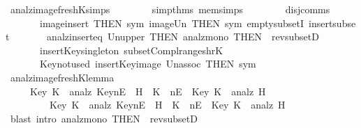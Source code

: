 \begin{isabellebody}
  \isamarkupfalse%
  \endisatagproof
  {\isafoldproof}%
  \isadelimproof
  \isanewline
  \endisadelimproof
  \isanewline
  \isamarkupfalse%
  \ analz{\isacharunderscore}image{\isacharunderscore}freshK{\isacharunderscore}simps\ {\isacharequal}\isanewline
  \ \ \ \ \ \ \ simp{\isacharunderscore}thms\ mem{\isacharunderscore}simps\ %
  \isanewline
  \ \ \ \ \ \ \ disj{\isacharunderscore}comms\ \isanewline
  \ \ \ \ \ \ \ image{\isacharunderscore}insert\ {\isacharbrackleft}THEN\ sym{\isacharbrackright}\ image{\isacharunderscore}Un\ {\isacharbrackleft}THEN\ sym{\isacharbrackright}\ empty{\isacharunderscore}subsetI\ insert{\isacharunderscore}subset\isanewline
  \ \ \ \ \ \ \ analz{\isacharunderscore}insert{\isacharunderscore}eq\ Un{\isacharunderscore}upper{}\ {\isacharbrackleft}THEN\ analz{\isacharunderscore}mono{\isacharcomma}\ THEN\ {\isacharbrackleft}{}{\isacharbrackright}\ rev{\isacharunderscore}subsetD{\isacharbrackright}\isanewline
  \ \ \ \ \ \ \ insert{\isacharunderscore}Key{\isacharunderscore}singleton\ subset{\isacharunderscore}Compl{\isacharunderscore}range{\isacharunderscore}shrK\isanewline
  \ \ \ \ \ \ \ Key{\isacharunderscore}not{\isacharunderscore}used\ insert{\isacharunderscore}Key{\isacharunderscore}image\ Un{\isacharunderscore}assoc\ {\isacharbrackleft}THEN\ sym{\isacharbrackright}\isanewline
  \isanewline
  \isanewline
  \isamarkupfalse%
  \ analz{\isacharunderscore}image{\isacharunderscore}freshK{\isacharunderscore}lemma{\isacharcolon}\isanewline
  \ \ \ \ \ {\isachardoublequoteopen}{\isacharparenleft}Key\ K\ {\isasymin}\ analz\ {\isacharparenleft}Key{\isacharbackquote}nE\ {\isasymunion}\ H{\isacharparenright}{\isacharparenright}\ {\isasymlongrightarrow}\ {\isacharparenleft}K\ {\isasymin}\ nE\ {\isacharbar}\ Key\ K\ {\isasymin}\ analz\ H{\isacharparenright}\ \ {\isasymLongrightarrow}\ \ \isanewline
  \ \ \ \ \ \ \ \ \ {\isacharparenleft}Key\ K\ {\isasymin}\ analz\ {\isacharparenleft}Key{\isacharbackquote}nE\ {\isasymunion}\ H{\isacharparenright}{\isacharparenright}\ {\isacharequal}\ {\isacharparenleft}K\ {\isasymin}\ nE\ {\isacharbar}\ Key\ K\ {\isasymin}\ analz\ H{\isacharparenright}{\isachardoublequoteclose}\isanewline
  \isadelimproof
  \endisadelimproof
  \isatagproof
  \isamarkupfalse%
  \ {\isacharparenleft}blast\ intro{\isacharcolon}\ analz{\isacharunderscore}mono\ {\isacharbrackleft}THEN\ {\isacharbrackleft}{}{\isacharbrackright}\ rev{\isacharunderscore}subsetD{\isacharbrackright}{\isacharparenright}%

\end{isabellebody}
